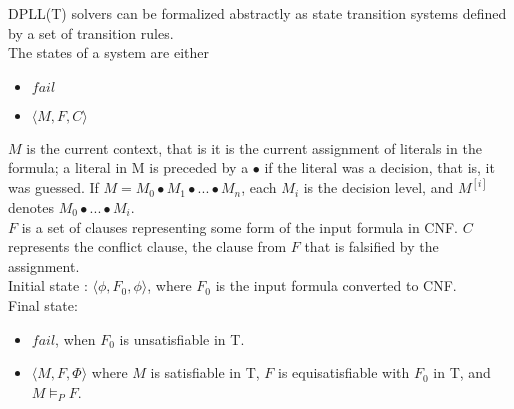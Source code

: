 \documentclass{report}
\begin{document}
DPLL(T) solvers can be formalized abstractly as 
state transition systems defined by a set of transition rules.\\
The states of a system are either
\begin{itemize}
	\item $fail$
	\item $\langle M, F, C \rangle$
\end{itemize}
$M$ is the current context, that is it is the current 
assignment of literals in the formula; a literal in M is 
preceded by a $\bullet$ if the literal was a decision, 
that is, it was guessed. 
If $M = M_0 \bullet M_1 \bullet ... \bullet M_n$, 
each $M_i$ is the decision level, and $M^{[i]}$ 
denotes $M_0 \bullet ... \bullet M_i$. \\
$F$ is a set of clauses representing some form of
the input formula in CNF. $C$ represents the conflict clause,
the clause from $F$ that is falsified by the assignment. \\
Initial state : $\langle \phi, F_0, \phi \rangle$, where $F_0$
is the input formula converted to CNF. \\
Final state:
\begin{itemize}
	\item $fail$, when $F_0$ is unsatisfiable in T.
	\item $\langle M, F, \Phi \rangle$ where $M$ is satisfiable in
	T, $F$ is equisatisfiable with $F_0$ in T, and $M \models_P F$.
\end{itemize}
\end{document}
